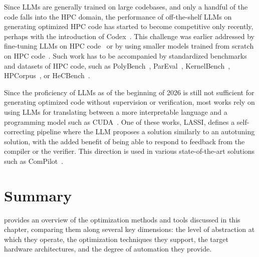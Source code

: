 Since LLMs are generally trained on large codebases, and only a handful of the code falls into the HPC domain, the performance of off-the-shelf LLMs on generating optimized HPC code has started to become competitive only recently, perhaps with the introduction of Codex~\cite{chen2021evaluating}. This challenge was earlier addressed by fine-tuning LLMs on HPC code~\cite{nichols2024performance} or by using smaller models trained from scratch on HPC code~\cite{xu2022systematic}. Such work has to be accompanied by standardized benchmarks and datasets of HPC code, such as PolyBench~\cite{pouchet2012polybench}, ParEval~\cite{nichols2024can}, KernelBench~\cite{ouyang2025kernelbench}, HPCorpus~\cite{kadosh2023quantifying}, or HeCBench~\cite{jin2023benchmark}.

Since the proficiency of LLMs as of the beginning of 2026 is still not sufficient for generating optimized code without supervision or verification, most works rely on using LLMs for translating between a more interpretable language and a programming model such as CUDA~\cite{palkowski2024gpt,dearing2024lassi}. One of these works, LASSI, defines a self-correcting pipeline where the LLM proposes a solution similarly to an autotuning solution, with the added benefit of being able to respond to feedback from the compiler or the verifier. This direction is used in various state-of-the-art solutions such as ComPilot~\cite{merouani2025agentic}.


\section{Summary}\label{sec:optimization-methods-summary}

 provides an overview of the optimization methods and tools discussed in this chapter, comparing them along several key dimensions: the level of abstraction at which they operate, the optimization techniques they support, the target hardware architectures, and the degree of automation they provide.

